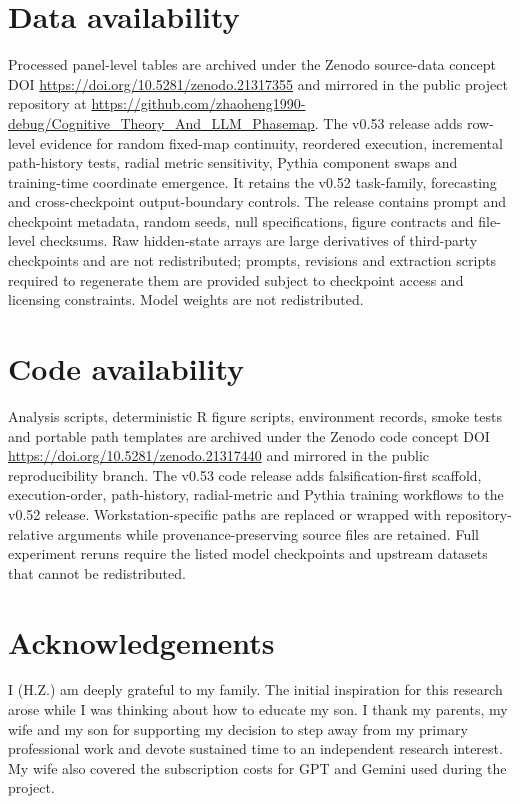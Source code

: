 \documentclass[11pt]{article}
\begin{document}
{\setlength{\parindent}{0pt}
\section{Data availability}
Processed panel-level tables are archived under the Zenodo source-data concept DOI \url{https://doi.org/10.5281/zenodo.21317355} and mirrored in the public project repository at \url{https://github.com/zhaoheng1990-debug/Cognitive_Theory_And_LLM_Phasemap}. The v0.53 release adds row-level evidence for random fixed-map continuity, reordered execution, incremental path-history tests, radial metric sensitivity, Pythia component swaps and training-time coordinate emergence. It retains the v0.52 task-family, forecasting and cross-checkpoint output-boundary controls. The release contains prompt and checkpoint metadata, random seeds, null specifications, figure contracts and file-level checksums. Raw hidden-state arrays are large derivatives of third-party checkpoints and are not redistributed; prompts, revisions and extraction scripts required to regenerate them are provided subject to checkpoint access and licensing constraints. Model weights are not redistributed.

\section{Code availability}
Analysis scripts, deterministic R figure scripts, environment records, smoke tests and portable path templates are archived under the Zenodo code concept DOI \url{https://doi.org/10.5281/zenodo.21317440} and mirrored in the public reproducibility branch. The v0.53 code release adds falsification-first scaffold, execution-order, path-history, radial-metric and Pythia training workflows to the v0.52 release. Workstation-specific paths are replaced or wrapped with repository-relative arguments while provenance-preserving source files are retained. Full experiment reruns require the listed model checkpoints and upstream datasets that cannot be redistributed.

\section{Acknowledgements}
I (H.Z.) am deeply grateful to my family. The initial inspiration for this research arose while I was thinking about how to educate my son. I thank my parents, my wife and my son for supporting my decision to step away from my primary professional work and devote sustained time to an independent research interest. My wife also covered the subscription costs for GPT and Gemini used during the project.

}
\end{document}
